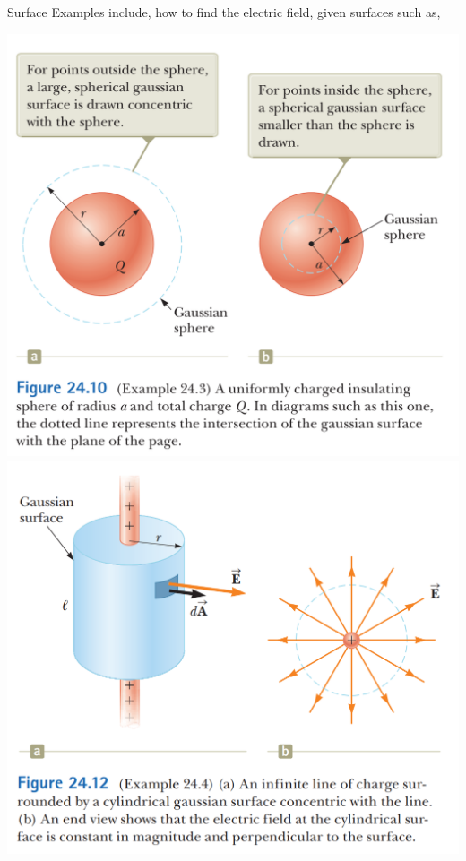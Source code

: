 \documentclass[12pt, titlepage, oneside]{article}
\begin{document}
\noindent Surface Examples include, how to find the electric field, given surfaces such as,
\begin{center}
	\includegraphics[scale=0.4]{5.PNG}
	\includegraphics[scale=0.4]{6.PNG}

\end{center}
\end{document}
